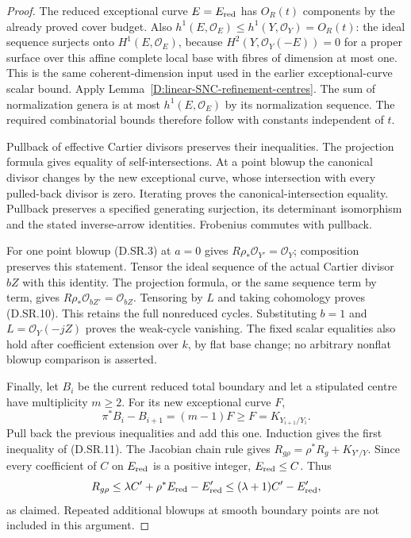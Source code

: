 \begin{proof}
The reduced exceptional curve $E=E_{\rm red}$ has
$O_R(t)$ components by the already proved cover budget.
Also $h^1(E,\mathcal O_E)\le h^1(Y,\mathcal O_Y)=O_R(t)$:
the ideal sequence surjects onto $H^1(E,\mathcal O_E)$,
because $H^2(Y,\mathcal O_Y(-E))=0$ for a proper surface
over this affine complete local base with fibres of
dimension at most one. This is the same coherent-dimension
input used in the earlier exceptional-curve scalar bound.
Apply Lemma~\ref{D:linear-SNC-refinement-centres}.
The sum of normalization genera is at most $h^1(E,\mathcal O_E)$
by its normalization sequence. The required combinatorial
bounds therefore follow with constants independent of $t$.

Pullback of effective Cartier divisors preserves their
inequalities. The projection formula gives equality of
self-intersections. At a point blowup the canonical
divisor changes by the new exceptional curve, whose
intersection with every pulled-back divisor is zero.
Iterating proves the canonical-intersection equality.
Pullback preserves a specified generating surjection,
its determinant isomorphism and the stated inverse-arrow
identities. Frobenius commutes with pullback.

For one point blowup (D.SR.3) at $a=0$ gives
$R\rho_*\mathcal O_{Y'}=\mathcal O_Y$; composition
preserves this statement. Tensor the ideal sequence
of the actual Cartier divisor $bZ$ with this identity.
The projection formula, or the same sequence term by
term, gives $R\rho_*\mathcal O_{bZ'}=\mathcal O_{bZ}$.
Tensoring by $L$ and taking cohomology proves (D.SR.10).
This retains the full nonreduced cycles. Substituting
$b=1$ and $L=\mathcal O_Y(-jZ)$ proves the weak-cycle
vanishing. The fixed scalar equalities also hold after
coefficient extension over $k$, by flat base change;
no arbitrary nonflat blowup comparison is asserted.

Finally, let $B_i$ be the current reduced total boundary
and let a stipulated centre have multiplicity $m\ge2$.
For its new exceptional curve $F$,
\[
 \pi^*B_i-B_{i+1}=(m-1)F\ge F=K_{Y_{i+1}/Y_i}.
                                                        \tag{D.SR.12}
\]
Pull back the previous inequalities and add this one.
Induction gives the first inequality of (D.SR.11).
The Jacobian chain rule gives
$R_{g\rho}=\rho^*R_g+K_{Y'/Y}$.
Since every coefficient of $C$ on $E_{\rm red}$ is a
positive integer, $E_{\rm red}\le C$. Thus
\[
 R_{g\rho}\le\lambda C'+\rho^*E_{\rm red}-E'_{\rm red}
             \le(\lambda+1)C'-E'_{\rm red},
\]
as claimed. Repeated additional blowups at smooth
boundary points are not included in this argument.
\end{proof}

